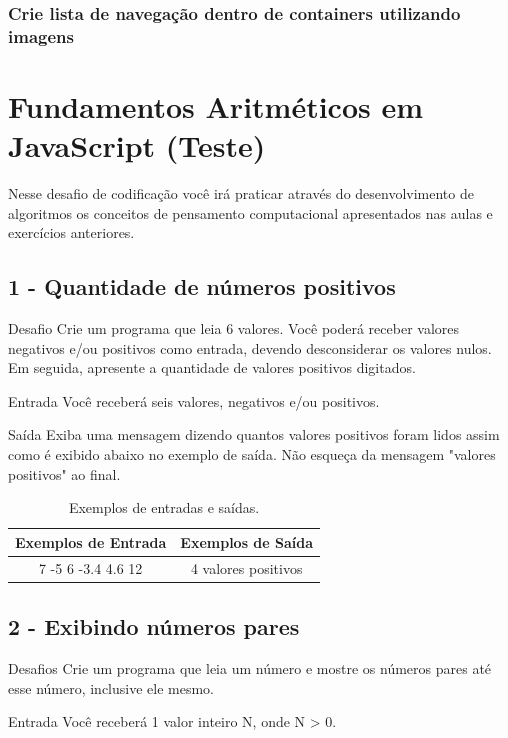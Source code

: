 \documentclass[12pt,a4paper]{article}
\begin{document}
	\subsubsection{Crie lista de navegação dentro de containers utilizando imagens}
	
	
	\section{Fundamentos Aritméticos em JavaScript (Teste)}
	
	Nesse desafio de codificação você irá praticar através do desenvolvimento de algoritmos os conceitos de pensamento computacional apresentados nas aulas e exercícios anteriores.
	
	\subsection{1 - Quantidade de números positivos}
	
	Desafio
	Crie um programa que leia 6 valores. Você poderá receber valores negativos e/ou positivos como entrada, devendo desconsiderar os valores nulos. Em seguida, apresente a quantidade de valores positivos digitados.
	
	Entrada
	Você receberá seis valores, negativos e/ou positivos.
	
	Saída
	Exiba uma mensagem dizendo quantos valores positivos foram lidos assim como é exibido abaixo no exemplo de saída. Não esqueça da mensagem "valores positivos" ao final.
	
	\begin{table}[!htpb]
		\centering
		\begin{tabular}{|c|c|}
			\hline
			Exemplos de Entrada & Exemplos de Saída \\
			\hline
			7 -5 6 -3.4 4.6 12 & 4 valores positivos\\
			\hline
		\end{tabular}
		\caption{Exemplos de entradas e saídas.}
		\label{tab:valEntradasSaidas1}
	\end{table}
	
	\subsection{2 - Exibindo números pares}

	Desafios
	Crie um programa que leia um número e mostre os números pares até esse número, inclusive ele mesmo.
	
	Entrada
	Você receberá 1 valor inteiro N, onde N > 0.
	
\end{document}
